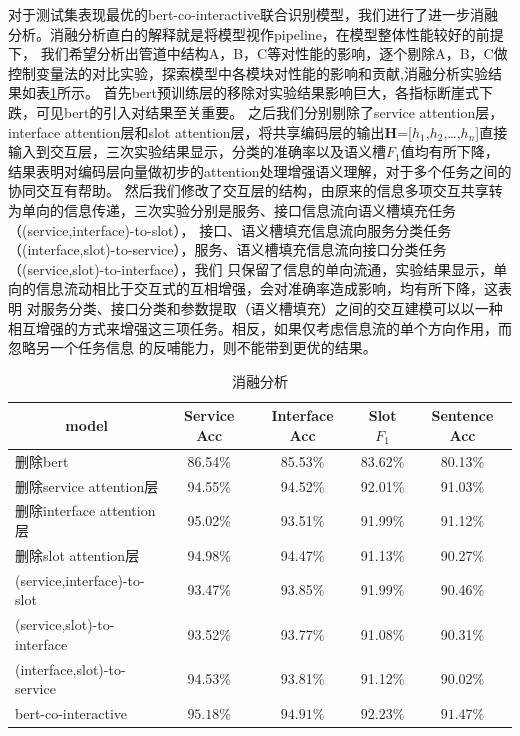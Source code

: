 对于测试集表现最优的bert-co-interactive联合识别模型，我们进行了进一步消融分析。消融分析直白的解释就是将模型视作pipeline，在模型整体性能较好的前提下，
我们希望分析出管道中结构A，B，C等对性能的影响，逐个剔除A，B，C做控制变量法的对比实验，探索模型中各模块对性能的影响和贡献,消融分析实验结果如表\ref{tab:xiaorongjieguo}所示。
首先bert预训练层的移除对实验结果影响巨大，各指标断崖式下跌，可见bert的引入对结果至关重要。
之后我们分别剔除了service attention层，interface attention层和slot attention层，将共享编码层的输出$\mathbf{H}$=[$h_{1}$,$h_{2}$,\dots,$h_{n}$]直接
输入到交互层，三次实验结果显示，分类的准确率以及语义槽$F_1$值均有所下降，结果表明对编码层向量做初步的attention处理增强语义理解，对于多个任务之间的协同交互有帮助。
然后我们修改了交互层的结构，由原来的信息多项交互共享转为单向的信息传递，三次实验分别是服务、接口信息流向语义槽填充任务（(service,interface)-to-slot），
接口、语义槽填充信息流向服务分类任务（(interface,slot)-to-service），服务、语义槽填充信息流向接口分类任务（(service,slot)-to-interface），我们
只保留了信息的单向流通，实验结果显示，单向的信息流动相比于交互式的互相增强，会对准确率造成影响，均有所下降，这表明
对服务分类、接口分类和参数提取（语义槽填充）之间的交互建模可以以一种相互增强的方式来增强这三项任务。相反，如果仅考虑信息流的单个方向作用，而忽略另一个任务信息
的反哺能力，则不能带到更优的结果。
\begin{table}[htb]
  \centering
  \caption{消融分析}
  \label{tab:xiaorongjieguo}
\begin{tabular}{l|cccc}
  \toprule
  \multicolumn{1}{c|}{\centering model}&Service Acc&Interface Acc&Slot $F_1$&Sentence Acc\\
 \hline
 删除bert&86.54\%&85.53\%&83.62\%&80.13\%\\
 删除service attention层&94.55\%&94.52\%&92.01\%&91.03\%\\
 删除interface attention层&95.02\%&93.51\%&91.99\%&91.12\%\\
 删除slot attention层&94.98\%&94.47\%&91.13\%&90.27\%\\
 (service,interface)-to-slot&93.47\%&93.85\%&91.99\%&90.46\%\\
 (service,slot)-to-interface&93.52\%&93.77\%&91.08\%&90.31\%\\
 (interface,slot)-to-service&94.53\%&93.81\%&91.12\%&90.02\%\\
 bert-co-interactive&$\mathbf{95.18\%}$&$\mathbf{94.91}\%$&$\mathbf{92.23}\%$&$\mathbf{91.47}\%$\\
\bottomrule
\end{tabular}
\end{table}

